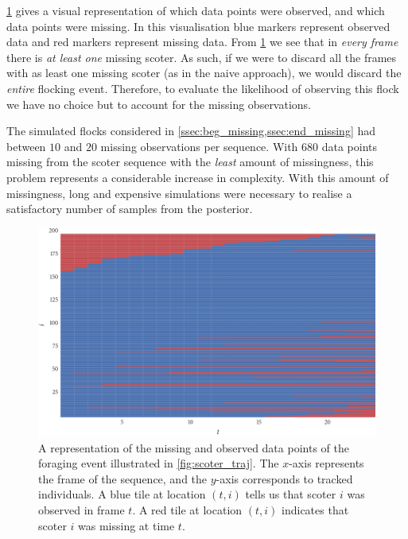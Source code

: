 \cref{fig:scoter_missing} gives a visual representation of which data points
were observed, and which data points were missing. In this visualisation blue
markers represent observed data and red markers represent missing data. From
\cref{fig:scoter_missing} we see that in \emph{every frame} there is \emph{at
least one} missing scoter. As such, if we were to discard all the frames with
as least one missing scoter (as in the naive approach), we would discard the
\emph{entire} flocking event. Therefore, to evaluate the likelihood of observing
this flock we have no choice but to account for the missing observations.

The simulated flocks considered in \cref{ssec:beg_missing,ssec:end_missing} had
between $10$ and $20$ missing observations per sequence. With $680$ data points
missing from the scoter sequence with the \emph{least} amount of missingness,
this problem represents a considerable increase in complexity. With this amount
of missingness, long and expensive simulations were necessary to realise a
satisfactory number of samples from the posterior.

\begin{figure}[tb]
  \includegraphics{data_00_missing.pdf}
  \caption{A representation of the missing and observed data points of the
    foraging event illustrated in \cref{fig:scoter_traj}. The $x$-axis
    represents the frame of the sequence, and the $y$-axis corresponds to
    tracked individuals. A blue tile at location $(t, i)$ tells us that scoter
    $i$ was observed in frame $t$. A red tile at location $(t, i)$ indicates
    that scoter $i$ was missing at time $t$.}
  \label{fig:scoter_missing}
\end{figure}

